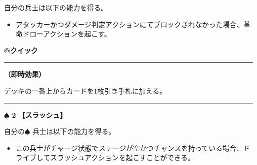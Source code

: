 \documentclass[twocolumn,a5paper,papersize,10pt]{jarticle}
\begin{document}
\vspace{1mm}%



自分の兵士は以下の能力を得る。


\vspace{-1zh}%
\begin{itemize}
\setlength{\leftskip}{-0.3cm}
\setlength{\parskip}{0pt} %

\item アタッカーかつダメージ判定アクションにてブロックされなかった場合、革命ドローアクションを起こす。
\vspace{-1zh}%
\end{itemize}

\begin{tcolorbox}[title={\small\bf【Action】革命ドロー}{\scriptsize （誘発）}]

{\scriptsize\bf @クイック }

\vspace{1mm} %
\hrule height 0.1mm depth 0mm width 62mm %
\vspace{1mm} %

{\bf（即時効果）}

デッキの一番上からカードを1枚引き手札に加える。

\vspace{1mm} %
\end{tcolorbox}

\vspace{-1zh}

 
 
 
 
 

\vspace{3mm} %
\hrule height 0.5mm depth 0mm width 66.5mm %
\vspace{1mm} %
{\Large\bf $\spadesuit$ 2} {\normalsize\bf【スラッシュ】} %
\vspace{1mm} %

自分の{\normalsize $\spadesuit$} 兵士は以下の能力を得る。


\vspace{-1zh}%
\begin{itemize}
\setlength{\leftskip}{-0.3cm}
\setlength{\parskip}{0pt} %

\item この兵士がチャージ状態でステージが空かつチャンスを持っている場合、ドライブしてスラッシュアクションを起こすことができる。
\vspace{-1zh}%
\end{itemize}
\end{document}
